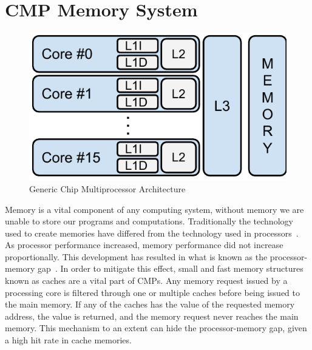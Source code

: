 \section{CMP Memory System}

\begin{figure}[ht]
\centering
\includegraphics[scale=.5]{figures/processor_model/processor_model}
\caption{Generic Chip Multiprocessor Architecture}
\label{fig:cmp_model}
\end{figure}

Memory is a vital component of any computing system, without memory we are unable to store our programs and computations.
Traditionally the technology used to create memories have differed from the technology used in processors~\cite{Wilkes2001}.
As processor performance increased, memory performance did not increase proportionally.
This development has resulted in what is known as the processor-memory gap~\cite{Wilkes2001}.
In order to mitigate this effect, small and fast memory structures known as caches are a vital part of CMPs.
Any memory request issued by a processing core is filtered through one or multiple caches before being issued to the main memory.
If any of the caches has the value of the requested memory address, the value is returned, and the memory request never reaches the main memory.
This mechanism to an extent can hide the processor-memory gap, given a high hit rate in cache memories.

